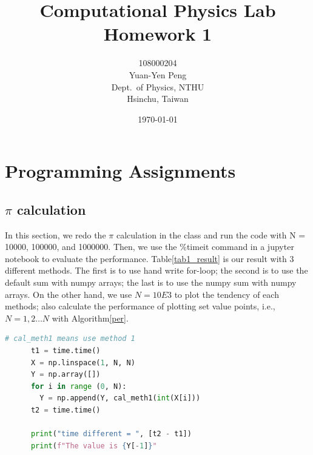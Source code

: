 \documentclass[12pt]{article}
\begin{document}
\title{\textbf{{\normalsize Computational Physics Lab}\\
                Homework 1}}
\author{108000204\\
        Yuan-Yen Peng\\
        Dept.\ of Physics, NTHU\\
        Hsinchu, Taiwan}
\date{\today}
\maketitle

\section{Programming Assignments}
  \subsection{$\pi$ calculation}

    In this section, we redo the $\pi$ calculation in the class and run the code with N = 10000, 100000, and 1000000. Then, we use the {\ttfamily\%timeit} command in a jupyter notebook to evaluate the performance. Table\ref{tab1_result} is our result with 3 different methods. The first is to use hand write for-loop; the second is to use the default sum with numpy arrays; the last is to use the numpy sum with numpy arrays. On the other hand, we use $N = 10E3$ to plot the tendency of each methods; also calculate the performance of plotting set value points, i.e., $N = 1, 2 \ldots N$ with Algorithm\ref{per}.

    \begin{lstlisting}[language={Python}, caption={Performance plotting, Three of mehod use the same plotting approach.\label{per}}]
      # cal_meth1 means use method 1
      t1 = time.time()
      X = np.linspace(1, N, N)
      Y = np.array([])
      for i in range (0, N):
        Y = np.append(Y, cal_meth1(int(X[i]))
      t2 = time.time()

      print("time different = ", [t2 - t1])
      print(f"The value is {Y[-1]}"
    \end{lstlisting}
\end{document}
